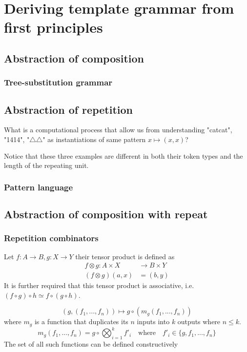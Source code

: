 \chapter{Deriving template grammar from first principles}
    \section{Abstraction of composition}



        \subsection{Tree-substitution grammar}
    \section{Abstraction of repetition}
        What is a computational process that allow us from understanding 
        "catcat", "1414", "$\triangle\triangle$" as instantiations of same pattern $x \mapsto (x,x)$?

        Notice that these three examples are different in both their token types 
        and the length of the repeating unit.

        \subsection{Pattern language}
    \section{Abstraction of composition with repeat}
        \subsection{Repetition combinators}

        Let $f : A \to B, g: X \to Y$ their tensor product is defined as
        \begin{align*}
            f \otimes g : A \times X  &\to B \times Y\\
            (f \otimes g)(a,x) &= (b,y)
        \end{align*}
        It is further required that this tensor product is associative, i.e. $(f \circ g) \circ h \simeq f \circ (g \circ h)$.

        $$
        (g, (f_1,...,f_n)) \mapsto g \circ (m_g(f_1,...,f_n))
        $$
        where $m_g$ is a function that duplicates its $n$ inputs into $k$ outputs where $n\leq k$.  
        $$
        m_g (f_1,...,f_n)= g\circ \bigotimes_{i=1}^k f'_i  \quad \text{where} \quad 
        f'_i \in \{g,f_1,...,f_n\}
        $$
        The set of all such functions can be defined constructively
        

